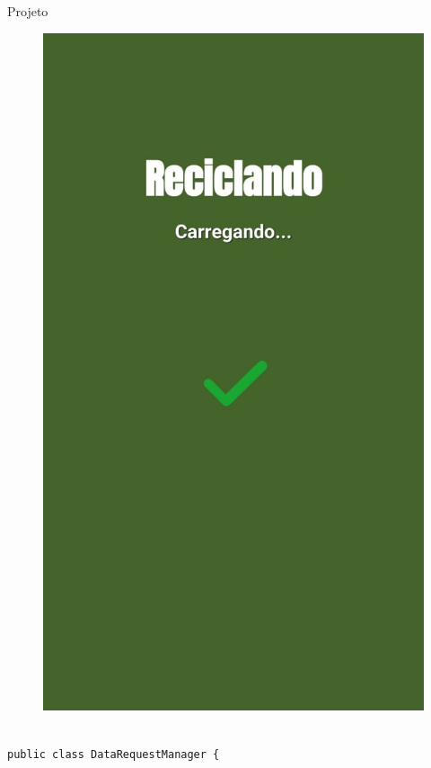 \documentclass[
	12pt,				%
	openright,			%
	twoside,			%
	a4paper,			%
	english,			%
	french,				%
	spanish,			%
	brazil				%
	]{abntex2}
\begin{document}
\begin{chapter}{Projeto}
\begin{figure}[htb]
\begin{minipage}{0.45\textwidth}
    \includegraphics[scale=0.35]{media/tela_splash_2.jpg}
     \label{fig:tela_splash_2_app}
  \end{minipage}
\end{figure}
\begin{lstlisting}[numbers=none,
basicstyle=\small,
caption={DataRequestManager.java},
title={DataRequestManager.java},
label={DataRequestManager.java}]

public class DataRequestManager {


\end{lstlisting}
\end{chapter}
\end{document}
